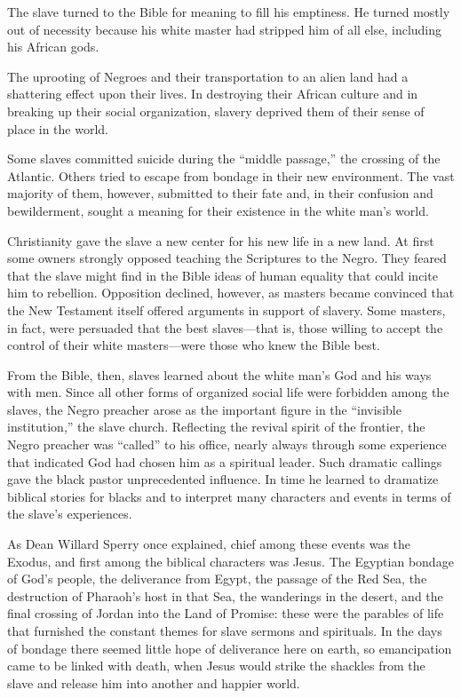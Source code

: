 The slave turned to the Bible for meaning to fill his emptiness. He turned mostly out of necessity
because his white master had stripped him of all else, including his African gods.

The uprooting of Negroes and their transportation to an alien land had a shattering effect upon
their lives. In destroying their African culture and in breaking up their social organization,
slavery deprived them of their sense of place in the world.

Some slaves committed suicide during the “middle passage,” the crossing of the Atlantic. Others
tried to escape from bondage in their new environment. The vast majority of them, however, submitted
to their fate and, in their confusion and bewilderment, sought a meaning for their existence in the
white man’s world.

Christianity gave the slave a new center for his new life in a new land. At first some owners
strongly opposed teaching the Scriptures to the Negro. They feared that the slave might find in the
Bible ideas of human equality that could incite him to rebellion. Opposition declined, however, as
masters became convinced that the New Testament itself offered arguments in support of slavery. Some
masters, in fact, were persuaded that the best slaves—that is, those willing to accept the control
of their white masters—were those who knew the Bible best.

From the Bible, then, slaves learned about the white man’s God and his ways with men. Since all
other forms of organized social life were forbidden among the slaves, the Negro preacher arose as
the important figure in the “invisible institution,” the slave church. Reflecting the revival spirit
of the frontier, the Negro preacher was “called” to his office, nearly always through some
experience that indicated God had chosen him as a spiritual leader. Such dramatic callings gave the
black pastor unprecedented influence. In time he learned to dramatize biblical stories for blacks
and to interpret many characters and events in terms of the slave’s experiences.

As Dean Willard Sperry once explained, chief among these events was the Exodus, and first among the
biblical characters was Jesus. The Egyptian bondage of God’s people, the deliverance from Egypt, the
passage of the Red Sea, the destruction of Pharaoh’s host in that Sea, the wanderings in the desert,
and the final crossing of Jordan into the Land of Promise: these were the parables of life that
furnished the constant themes for slave sermons and spirituals. In the days of bondage there seemed
little hope of deliverance here on earth, so emancipation came to be linked with death, when Jesus
would strike the shackles from the slave and release him into another and happier world.

